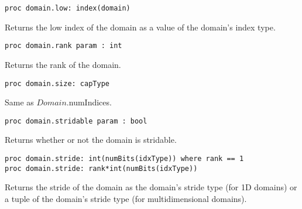 \begin{protohead}
\begin{verbatim}
proc domain.low: index(domain)
\end{verbatim}
\end{protohead}
\begin{protobody}
Returns the low index of the domain as a value of the domain's index
type.
\end{protobody}

\begin{protohead}
\begin{verbatim}
proc domain.rank param : int
\end{verbatim}
\end{protohead}
\begin{protobody}
Returns the rank of the domain.
\end{protobody}

\begin{protohead}
\begin{verbatim}
proc domain.size: capType
\end{verbatim}
\end{protohead}
\begin{protobody}
Same as $Domain$.numIndices.
\end{protobody}

\begin{protohead}
\begin{verbatim}
proc domain.stridable param : bool
\end{verbatim}
\end{protohead}
\begin{protobody}
Returns whether or not the domain is stridable.
\end{protobody}

\begin{protohead}
\begin{verbatim}
proc domain.stride: int(numBits(idxType)) where rank == 1
proc domain.stride: rank*int(numBits(idxType))
\end{verbatim}
\end{protohead}
\begin{protobody}
Returns the stride of the domain as the domain's stride type (for 1D
domains) or a tuple of the domain's stride type (for multidimensional
domains).
\end{protobody}

